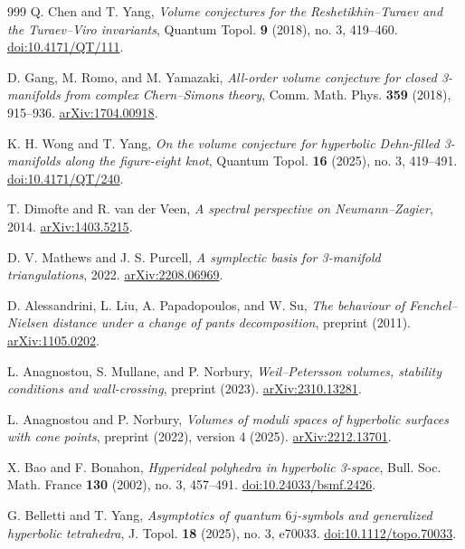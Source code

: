 \documentclass[11pt,a4paper]{article}
\numberwithin{equation}{section}
\theoremstyle{definition}
\theoremstyle{remark}
\begin{document}
\begin{thebibliography}{999}
Q. Chen and T. Yang,
\emph{Volume conjectures for the Reshetikhin--Turaev and the
Turaev--Viro invariants},
Quantum Topol. \textbf{9} (2018), no. 3, 419--460.
\href{https://doi.org/10.4171/QT/111}{doi:10.4171/QT/111}.

D. Gang, M. Romo, and M. Yamazaki,
\emph{All-order volume conjecture for closed 3-manifolds from
complex Chern--Simons theory},
Comm. Math. Phys. \textbf{359} (2018), 915--936.
\href{https://arxiv.org/abs/1704.00918}{arXiv:1704.00918}.

K. H. Wong and T. Yang,
\emph{On the volume conjecture for hyperbolic Dehn-filled 3-manifolds
along the figure-eight knot},
Quantum Topol. \textbf{16} (2025), no. 3, 419--491.
\href{https://doi.org/10.4171/QT/240}{doi:10.4171/QT/240}.

T. Dimofte and R. van der Veen,
\emph{A spectral perspective on Neumann--Zagier}, 2014.
\href{https://arxiv.org/abs/1403.5215}{arXiv:1403.5215}.

D. V. Mathews and J. S. Purcell,
\emph{A symplectic basis for 3-manifold triangulations}, 2022.
\href{https://arxiv.org/abs/2208.06969}{arXiv:2208.06969}.

D. Alessandrini, L. Liu, A. Papadopoulos, and W. Su,
\emph{The behaviour of Fenchel--Nielsen distance under a change of pants
decomposition}, preprint (2011).
\href{https://arxiv.org/abs/1105.0202}{arXiv:1105.0202}.

L. Anagnostou, S. Mullane, and P. Norbury,
\emph{Weil--Petersson volumes, stability conditions and wall-crossing},
preprint (2023).
\href{https://arxiv.org/abs/2310.13281}{arXiv:2310.13281}.

L. Anagnostou and P. Norbury,
\emph{Volumes of moduli spaces of hyperbolic surfaces with cone points},
preprint (2022), version 4 (2025).
\href{https://arxiv.org/abs/2212.13701}{arXiv:2212.13701}.

X. Bao and F. Bonahon,
\emph{Hyperideal polyhedra in hyperbolic 3-space},
Bull. Soc. Math. France \textbf{130} (2002), no. 3, 457--491.
\href{https://doi.org/10.24033/bsmf.2426}{doi:10.24033/bsmf.2426}.

G. Belletti and T. Yang,
\emph{Asymptotics of quantum $6j$-symbols and generalized hyperbolic tetrahedra},
J. Topol. \textbf{18} (2025), no. 3, e70033.
\href{https://doi.org/10.1112/topo.70033}{doi:10.1112/topo.70033}.


\end{thebibliography}
\end{document}
